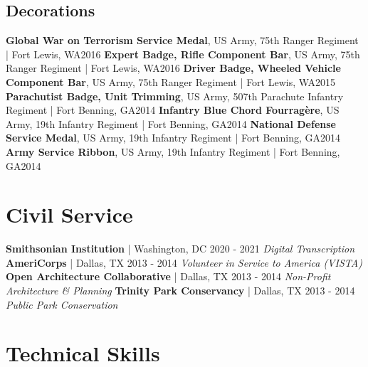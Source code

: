 \documentclass{article}
\begin{document}
    \subsection*{Decorations}
        \textbf{Global War on Terrorism Service Medal}, US Army, 75th Ranger Regiment | Fort Lewis, WA\hfill{2016}\newline
        \textbf{Expert Badge, Rifle Component Bar}, US Army, 75th Ranger Regiment | Fort Lewis, WA\hfill{2016}\newline
        \textbf{Driver Badge, Wheeled Vehicle Component Bar}, US Army, 75th Ranger Regiment | Fort Lewis, WA\hfill{2015}\newline
        \textbf{Parachutist Badge, Unit Trimming}, US Army, 507th Parachute Infantry Regiment | Fort Benning, GA\hfill{2014}\newline
        \textbf{Infantry Blue Chord Fourragère}, US Army, 19th Infantry Regiment | Fort Benning, GA\hfill{2014}\newline
        \textbf{National Defense Service Medal}, US Army, 19th Infantry Regiment | Fort Benning, GA\hfill{2014}\newline
        \textbf{Army Service Ribbon}, US Army, 19th Infantry Regiment | Fort Benning, GA\hfill{2014}
    \section*{Civil Service}
        \textbf{Smithsonian Institution} | Washington, DC \hfill{2020 - 2021}\newline
        \textit{Digital Transcription}\newline\newline
        \textbf{AmeriCorps} | Dallas, TX \hfill{2013 - 2014}\newline
        \textit{Volunteer in Service to America (VISTA)}\newline\newline
        \textbf{Open Architecture Collaborative} | Dallas, TX \hfill{2013 - 2014}\newline
        \textit{Non-Profit Architecture \& Planning}\newline\newline
        \textbf{Trinity Park Conservancy} | Dallas, TX \hfill{2013 - 2014}\newline
        \textit{Public Park Conservation}
    \section*{Technical Skills}
\end{document}
